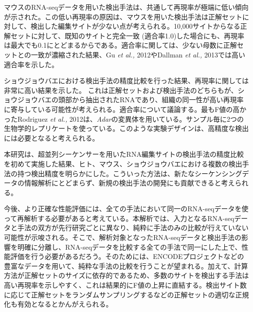 \par
マウスのRNA-seqデータを用いた検出手法は、共通して再現率が極端に低い傾向が示された。この低い再現率の原因は、マウスを用いた検出手法は正解セットに対して、検出した編集サイトが少ない点が考えられる。10,000サイトからなる正解セットに対して、既知のサイトと完全一致 (適合率1.0)した場合にも、再現率は最大でも0.1にとどまるからである。適合率に関しては、少ない母数に正解セットとの一致が濃縮された結果、Gu \textit{et al., }2012やDallman \textit{et al., }2013では高い適合率を示した。
\par
ショウジョウバエにおける検出手法の精度比較を行った結果、再現率に関しては非常に高い結果を示した。
これは正解セットおよび検出手法のどちらもが、ショウジョウバエの頭部から抽出されたRNAであり、組織の同一性が高い再現率に寄与している可能性が考えられる。適合率について議論する。最もF値の高かったRodriguez \textit{et al., }2012は、\textit{Adar}の変異体を用いている。サンプル毎に2つの生物学的レプリケートを使っている。このような実験デザインは、高精度な検出には必要となると考えられる。
\par
本研究は、超並列シーケンサーを用いたRNA編集サイトの検出手法の精度比較を初めて実施した結果、ヒト、マウス、ショウジョウバエにおける複数の検出手法の持つ検出精度を明らかにした。こういった方法は、新たなシーケンシングデータの情報解析にとどまらず、新規の検出手法の開発にも貢献できると考えられる。
\par
今後、より正確な性能評価には、全ての手法において同一のRNA-seqデータを使って再解析する必要があると考えている。本解析では、入力となるRNA-seqデータと手法の双方が先行研究ごとに異なり、純粋に手法のみの比較が行えていない可能性が示唆される。そこで、解析対象となったRNA-seqデータと検出手法の影響を明確に分離し、RNA-seqデータを比較する全ての手法で同一にした上で、性能評価を行う必要があるだろう。そのためには、ENCODEプロジェクトなどの豊富なデータを用いて、純粋な手法の比較を行うことが望まれる。加えて、計算方法が正解セットのサイズに依存的であるため、多数のサイトを検出する手法は高い再現率を示しやすく、これは結果的にF値の上昇に直結する。検出サイト数に応じて正解セットをランダムサンプリングするなどの正解セットの適切な正規化も有効となるとかんがえられる。


